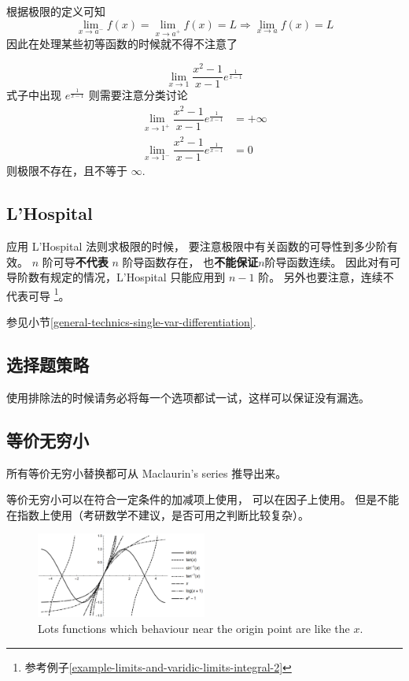 根据极限的定义可知
\[
    \lim_{x \to a^-} f(x) = \lim_{x \to a^+} f(x) = L 
    \Rightarrow 
    \lim_{x\to a} f(x) = L
\]
因此在处理某些初等函数的时候就不得不注意了
\begin{example}
    \cite[page 9]{yc}
    \[
        \lim_{x \to 1} \dfrac{x^2 - 1}{x-1} e^{\frac{1}{x-1}}
    \]
    式子中出现 $e^{\frac{1}{x-1}}$ 则需要注意分类讨论
    \begin{align*}
        \lim_{x \to 1^+} \dfrac{x^2 - 1}{x-1} e^{\frac{1}{x-1}} &= +\infty\\
        \lim_{x \to 1^-} \dfrac{x^2 - 1}{x-1} e^{\frac{1}{x-1}} &= 0
    \end{align*}
    则极限不存在，且不等于 $\infty$.
\end{example} 

\subsection{L'Hospital}

应用 L'Hospital 法则求极限的时候，
要注意极限中有关函数的可导性到多少阶有效。
$n$ 阶可导\textbf{不代表} $n$ 阶导函数存在，
也\textbf{不能保证}$n$阶导函数连续。
因此对有可导阶数有规定的情况，L'Hospital 只能应用到 $n-1$ 阶。
另外也要注意，连续不代表可导
\footnote{参考例子\ref{example-limits-and-varidic-limits-integral-2}}。

参见小节\ref{general-technics-single-var-differentiation}.

\subsection{选择题策略}

使用排除法的时候请务必将每一个选项都试一试，这样可以保证没有漏选。

\subsection{等价无穷小}  \label{super-small}
所有等价无穷小替换都可从 Maclaurin's series 推导出来。

等价无穷小可以在符合一定条件的加减项上使用，
可以在因子上使用。
但是不能在指数上使用（考研数学不建议，是否可用之判断比较复杂）。

\begin{figure}
    \centering
    \includegraphics[width=0.5\textwidth]{figure/lots-functiuons-like-x-near-0.png}
    \caption{Lots functions which behaviour near the origin point are like the $x$.}
    \label{fig:lots-functiuons-like-x-near-0}
\end{figure}

